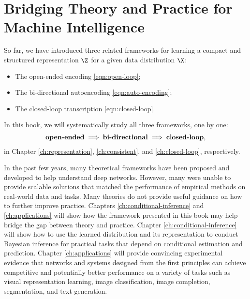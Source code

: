\documentclass[../../book-main.tex]{subfiles}
\begin{document}
\section{Bridging Theory and Practice for Machine Intelligence}
So far, we have introduced three related  frameworks for learning a compact and structured representation $\Z$ for a given data distribution $\X$: 
\begin{itemize}
\item The open-ended encoding \eqref{eqn:open-loop};
\item The bi-directional autoencoding \eqref{eqn:auto-encoding};
\item The closed-loop transcription \eqref{eqn:closed-loop}.
\end{itemize}
In this book, we will systematically study all three frameworks, one by one:
\begin{equation}
    \mbox{\textbf{open-ended}} \; \Longrightarrow \; 
    \mbox{\textbf{bi-directional}} \;  \Longrightarrow \; \mbox{\textbf{closed-loop}},
\end{equation}
in Chapter \ref{ch:representation}, \ref{ch:consistent}, and \ref{ch:closed-loop}, respectively.

In the past few years, many theoretical frameworks have been proposed and developed to help understand deep networks. However, many were unable to provide scalable solutions that matched the performance of empirical methods on real-world data and tasks. Many theories do not provide useful guidance on how to further improve practice. Chapters \ref{ch:conditional-inference} and  \ref{ch:applications} will show how the framework presented in this book may help bridge the gap between theory and practice. Chapter \ref{ch:conditional-inference} will show how to use the learned distribution and its representation to conduct Bayesian inference for practical tasks that depend on conditional estimation and prediction. Chapter \ref{ch:applications} will provide convincing experimental evidence that networks and systems designed from the first principles can achieve competitive and potentially better performance on a variety of tasks such as visual representation learning,  image classification, image completion, segmentation, and text generation.
\end{document}
